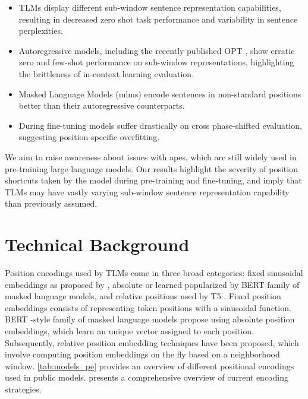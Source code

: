 \documentclass[letterpaper, 12pt]{report}
\begin{document}
\begin{itemize}
    \item TLMs display different sub-window sentence representation capabilities, resulting in decreased zero shot task performance and variability in sentence perplexities.
    \item Autoregressive models, including the recently published OPT \cite{Zhang2022:OPT}, show erratic zero and few-shot performance on sub-window representations, highlighting the brittleness of in-context learning evaluation.
    \item Masked Language Models (\acrshort{mlm}s) encode sentences in non-standard positions better than their autoregressive counterparts.
    \item During fine-tuning models suffer drastically on cross phase-shifted evaluation, suggesting position specific overfitting.
\end{itemize}

\noindent We aim to raise awareness about issues with \acrshort{ape}s, which are still widely used in pre-training large language models.
Our results highlight the severity of position shortcuts taken by the model during pre-training and fine-tuning, and imply that TLMs may have vastly varying sub-window sentence representation capability than previously assumed.
%

\section{Technical Background}
\label{sec:pos_technical_bg}

Position encodings used by TLMs come in three broad categories: fixed sinusoidal embeddings as proposed by \citet{vaswani-etal-2017-attention}, absolute or learned popularized by BERT \cite{devlin-etal-2019-bert} family of masked language models, and relative positions \citep{shaw-etal-2018-self} used by T5 \cite{Raffel2020:T5}.
Fixed position embeddings \cite{vaswani-etal-2017-attention} consists of representing token positions with a sinusoidal function. BERT \citep{devlin-etal-2019-bert}-style family of masked language models propose using absolute position embeddings, which learn an unique vector assigned to each position.
Subsequently, relative position embedding techniques have been proposed, which involve computing position embeddings on the fly based on a neighborhood window. \autoref{tab:models_pe} provides an overview of different positional encodings used in public models.
\citet{wang2021on} presents a comprehensive overview of current encoding strategies.
\end{document}
